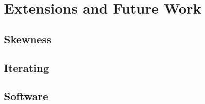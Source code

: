 \section{Extensions and Future Work}

\subsection{Skewness}

\subsection{Iterating}

\subsection{Software}

